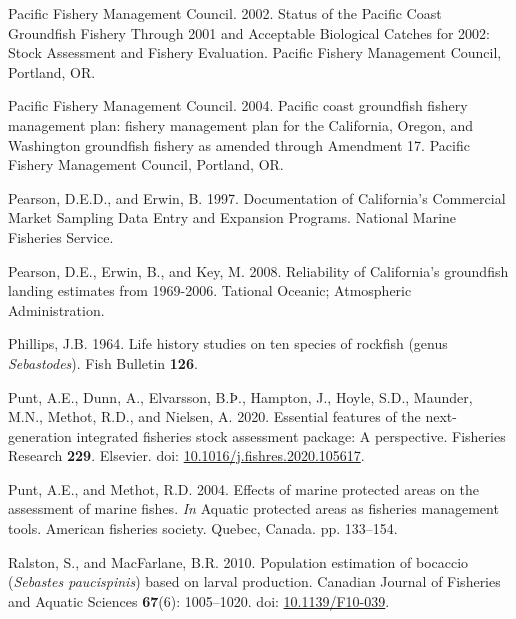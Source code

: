 \documentclass[11pt,
  english,
]{article}
\newlength{\cslhangindent}
\newenvironment{CSLReferences}[2] %
 {%
  \setlength{\parindent}{0pt}
  \ifodd #1 \everypar{\setlength{\hangindent}{\cslhangindent}}\ignorespaces\fi
  \ifnum #2 > 0
  \setlength{\parskip}{#2\baselineskip}
  \fi
 }%
 {}
\begin{document}
\begin{CSLReferences}{1}{0}
\leavevmode{}%
Pacific Fishery Management Council. 2002. {Status of the Pacific Coast Groundfish Fishery Through 2001 and Acceptable Biological Catches for 2002: Stock Assessment and Fishery Evaluation.} Pacific Fishery Management Council, Portland, OR.

\leavevmode{}%
Pacific Fishery Management Council. 2004. {Pacific coast groundfish fishery management plan: fishery management plan for the California, Oregon, and Washington groundfish fishery as amended through Amendment 17}. Pacific Fishery Management Council, Portland, OR.

\leavevmode{}%
Pearson, D.E.D., and Erwin, B. 1997. {Documentation of California's Commercial Market Sampling Data Entry and Expansion Programs}. National Marine Fisheries Service.

\leavevmode{}%
Pearson, D.E., Erwin, B., and Key, M. 2008. {Reliability of California's groundfish landing estimates from 1969-2006}. Tational Oceanic; Atmospheric Administration.

\leavevmode{}%
Phillips, J.B. 1964. {Life history studies on ten species of rockfish (genus \emph{Sebastodes})}. Fish Bulletin \textbf{126}.

\leavevmode{}%
Punt, A.E., Dunn, A., Elvarsson, B.Þ., Hampton, J., Hoyle, S.D., Maunder, M.N., Methot, R.D., and Nielsen, A. 2020. {Essential features of the next-generation integrated fisheries stock assessment package: A perspective}. Fisheries Research \textbf{229}. Elsevier. doi: \href{https://doi.org/10.1016/j.fishres.2020.105617}{10.1016/j.fishres.2020.105617}.

\leavevmode{}%
Punt, A.E., and Methot, R.D. 2004. {Effects of marine protected areas on the assessment of marine fishes}. \emph{In} Aquatic protected areas as fisheries management tools. American fisheries society. Quebec, Canada. pp. 133--154.

\leavevmode{}%
Ralston, S., and MacFarlane, B.R. 2010. {Population estimation of bocaccio (\emph{Sebastes paucispinis}) based on larval production}. Canadian Journal of Fisheries and Aquatic Sciences \textbf{67}(6): 1005--1020. doi: \href{https://doi.org/10.1139/F10-039}{10.1139/F10-039}.


\end{CSLReferences}
\end{document}
